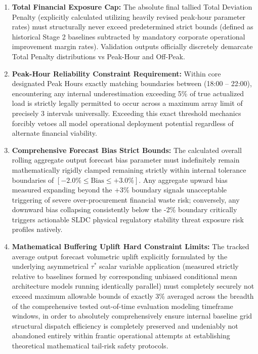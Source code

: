 \documentclass[11pt,a4paper]{article}
\begin{document}
\begin{enumerate}
    \item \textbf{Total Financial Exposure Cap:} The absolute final tallied Total Deviation Penalty (explicitly calculated utilizing heavily revised peak-hour parameter rates) must structurally never exceed predetermined strict bounds (defined as historical Stage 2 baselines subtracted by mandatory corporate operational improvement margin rates). Validation outputs officially discretely demarcate Total Penalty distributions vs Peak-Hour and Off-Peak.
    \item \textbf{Peak-Hour Reliability Constraint Requirement:} Within core designated Peak Hours exactly matching boundaries between (18:00 -- 22:00), encountering any internal underestimation exceeding 5\% of true actualized load is strictly legally permitted to occur across a maximum array limit of precisely 3 intervals universally. Exceeding this exact threshold mechanics forcibly vetoes all model operational deployment potential regardless of alternate financial viability.
    \item \textbf{Comprehensive Forecast Bias Strict Bounds:} The calculated overall rolling aggregate output forecast bias parameter must indefinitely remain mathematically rigidly clamped remaining strictly within internal tolerance boundaries of $[-2.0\% \leq \text{Bias} \leq +3.0\%]$. Any aggregate upward bias measured expanding beyond the +3\% boundary signals unacceptable triggering of severe over-procurement financial waste risk; conversely, any downward bias collapsing consistently below the -2\% boundary critically triggers actionable SLDC physical regulatory stability threat exposure risk profiles natively.
    \item \textbf{Mathematical Buffering Uplift Hard Constraint Limits:} The tracked average output forecast volumetric uplift explicitly formulated by the underlying asymmetrical $\tau^*$ scalar variable application (measured strictly relative to baselines formed by corresponding unbiased conditional mean architecture models running identically parallel) must completely securely not exceed maximum allowable bounds of exactly 3\% averaged across the breadth of the comprehensive tested out-of-time evaluation modeling timeframe windows, in order to absolutely comprehensively ensure internal baseline grid structural dispatch efficiency is completely preserved and undeniably not abandoned entirely within frantic operational attempts at establishing theoretical mathematical tail-risk safety protocols.
\end{enumerate}
\end{document}
